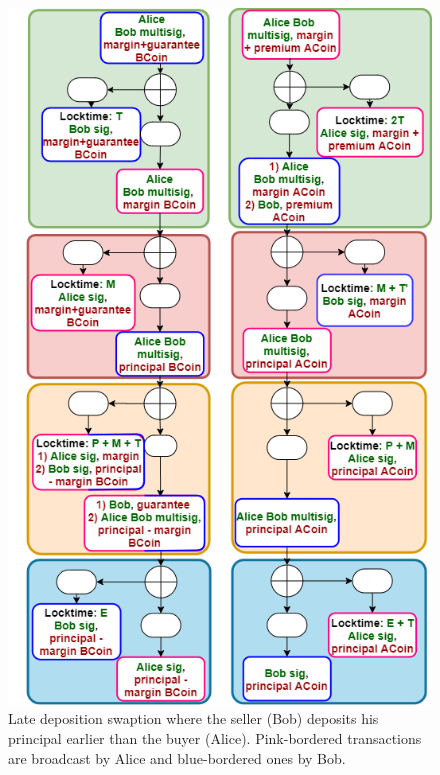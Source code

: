 \begin{figure}
    \centering
    \includegraphics[width=\textwidth,height=0.93\textheight,keepaspectratio]{figures/late dep.png}
    \caption{Late deposition swaption where the seller (Bob) deposits his principal earlier than the buyer (Alice). Pink-bordered transactions are broadcast by Alice and blue-bordered ones by Bob.}
    \label{fig:swaption-late-deposition}
\end{figure}

